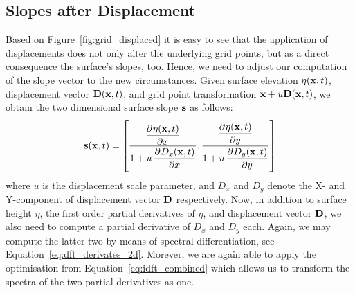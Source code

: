 \subsection{Slopes after Displacement}
%
Based on Figure~\ref{fig:grid_displaced} it is easy to see that the application 
of displacements does not only alter the underlying grid points, but as a 
direct consequence the surface's slopes, too. Hence, we need to adjust our 
computation of the slope vector to the new circumstances. Given surface 
elevation $\eta(\mathbf{x},t)$, displacement vector $\mathbf{D}(\mathbf{x},t)$,
and grid point transformation  $\mathbf{x} + u\mathbf{D}(\mathbf{x},t)$, we obtain the
two dimensional surface slope
$\mathbf{s}$ as follows:
\begin{equation}
\mvec{s}(\mvec{x},t) = \left[\frac{\dpd{\eta(\mvec{x},t)}{x}}{1 + u 
\dpd{D_x(\mvec{x},t)}{x}}, \frac{\dpd{\eta(\mvec{x},t)}{y}}{1 + u 
\dpd{D_y(\mvec{x},t)}{y}}\right]
\end{equation}
where $u$ is the displacement scale parameter, and $D_x$ and $D_y$ denote the X-
and Y-component of displacement vector $\mathbf{D}$ respectively. Now, in addition
to surface height $\eta$, the first order partial derivatives of $\eta$, and
displacement vector $\mathbf{D}$, we also need to compute a partial derivative of
$D_x$ and $D_y$ each. Again, we may compute the latter two by means of spectral
differentiation, see Equation~\ref{eq:dft_derivates_2d}. Morever, we are again
able to apply the optimisation from Equation~\ref{eq:idft_combined} which allows
us to transform the spectra of the two partial derivatives as one.
%
